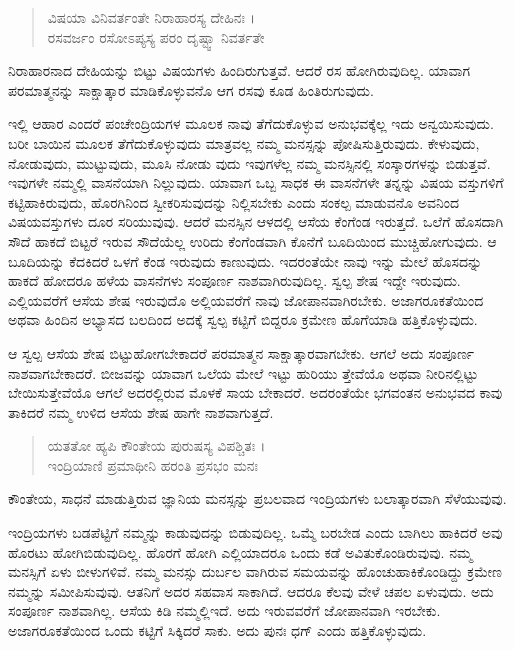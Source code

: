 \begin{verse}
ವಿಷಯಾ ವಿನಿವರ್ತಂತೇ ನಿರಾಹಾರಸ್ಯ ದೇಹಿನಃ ।\\ರಸವರ್ಜಂ ರಸೋಽಪ್ಯಸ್ಯ ಪರಂ ದೃಷ್ಟ್ವಾ ನಿವರ್ತತೇ 
\end{verse}

{\small ನಿರಾಹಾರನಾದ ದೇಹಿಯನ್ನು ಬಿಟ್ಟು ವಿಷಯಗಳು ಹಿಂದಿರುಗುತ್ತವೆ. ಆದರೆ ರಸ ಹೋಗಿರುವುದಿಲ್ಲ. ಯಾವಾಗ ಪರಮಾತ್ಮನನ್ನು ಸಾಕ್ಷಾತ್ಕಾರ ಮಾಡಿಕೊಳ್ಳುವನೊ ಆಗ ರಸವು ಕೂಡ ಹಿಂತಿರುಗುವುದು.}

ಇಲ್ಲಿ ಆಹಾರ ಎಂದರೆ ಪಂಚೇಂದ್ರಿಯಗಳ ಮೂಲಕ ನಾವು ತೆಗೆದುಕೊಳ್ಳುವ ಅನುಭವಕ್ಕೆಲ್ಲ ಇದು ಅನ್ವಯಿಸುವುದು. ಬರೀ ಬಾಯಿನ ಮೂಲಕ ತೆಗೆದುಕೊಳ್ಳುವುದು ಮಾತ್ರವಲ್ಲ ನಮ್ಮ ಮನಸ್ಸನ್ನು ಪೋಷಿಸುತ್ತಿರುವುದು. ಕೇಳುವುದು, ನೋಡುವುದು, ಮುಟ್ಟುವುದು, ಮೂಸಿ ನೋಡು ವುದು ಇವುಗಳೆಲ್ಲ ನಮ್ಮ ಮನಸ್ಸಿನಲ್ಲಿ ಸಂಸ್ಕಾರಗಳನ್ನು ಬಿಡುತ್ತವೆ. ಇವುಗಳೇ ನಮ್ಮಲ್ಲಿ ವಾಸನೆಯಾಗಿ ನಿಲ್ಲುವುದು. ಯಾವಾಗ ಒಬ್ಬ ಸಾಧಕ ಈ ವಾಸನೆಗಳೇ ತನ್ನನ್ನು ವಿಷಯ ವಸ್ತುಗಳಿಗೆ ಕಟ್ಟಿಹಾಕಿರುವುದು, ಹೊರಗಿನಿಂದ ಸ್ವೀಕರಿಸುವುದನ್ನು ನಿಲ್ಲಿಸಬೇಕು ಎಂದು ಸಂಕಲ್ಪ ಮಾಡುವನೊ ಅವನಿಂದ ವಿಷಯವಸ್ತುಗಳು ದೂರ ಸರಿಯುವುವು. ಆದರೆ ಮನಸ್ಸಿನ ಆಳದಲ್ಲಿ ಆಸೆಯ ಕೆಂಗೆಂಡ ಇರುತ್ತದೆ. ಒಲೆಗೆ ಹೊಸದಾಗಿ ಸೌದೆ ಹಾಕದೆ ಬಿಟ್ಟರೆ ಇರುವ ಸೌದೆಯೆಲ್ಲ ಉರಿದು ಕೆಂಗೆಂಡವಾಗಿ ಕೊನೆಗೆ ಬೂದಿಯಿಂದ ಮುಚ್ಚಿಹೋಗುವುದು. ಆ ಬೂದಿಯನ್ನು ಕೆದಕಿದರೆ ಒಳಗೆ ಕೆಂಡ ಇರುವುದು ಕಾಣುವುದು. ಇದರಂತೆಯೇ ನಾವು ಇನ್ನು ಮೇಲೆ ಹೊಸದನ್ನು ಹಾಕದೆ ಹೋದರೂ ಹಳೆಯ ವಾಸನೆಗಳು ಸಂಪೂರ್ಣ ನಾಶವಾಗಿರುವುದಿಲ್ಲ. ಸ್ವಲ್ಪ ಶೇಷ ಇದ್ದೇ ಇರುವುದು. ಎಲ್ಲಿಯವರೆಗೆ ಆಸೆಯ ಶೇಷ ಇರುವುದೊ ಅಲ್ಲಿಯವರೆಗೆ ನಾವು ಜೋಪಾನವಾಗಿರಬೇಕು. ಅಜಾಗರೂಕತೆಯಿಂದ ಅಥವಾ ಹಿಂದಿನ ಅಭ್ಯಾಸದ ಬಲದಿಂದ ಅದಕ್ಕೆ ಸ್ವಲ್ಪ ಕಟ್ಟಿಗೆ ಬಿದ್ದರೂ ಕ್ರಮೇಣ ಹೊಗೆಯಾಡಿ ಹತ್ತಿಕೊಳ್ಳುವುದು.

ಆ ಸ್ವಲ್ಪ ಆಸೆಯ ಶೇಷ ಬಿಟ್ಟುಹೋಗಬೇಕಾದರೆ ಪರಮಾತ್ಮನ ಸಾಕ್ಷಾತ್ಕಾರವಾಗಬೇಕು. ಆಗಲೆ ಅದು ಸಂಪೂರ್ಣ ನಾಶವಾಗಬೇಕಾದರೆ. ಬೀಜವನ್ನು ಯಾವಾಗ ಒಲೆಯ ಮೇಲೆ ಇಟ್ಟು ಹುರಿಯು ತ್ತೇವೆಯೊ ಅಥವಾ ನೀರಿನಲ್ಲಿಟ್ಟು ಬೇಯಿಸುತ್ತೇವೆಯೊ ಆಗಲೆ ಅದರಲ್ಲಿರುವ ಮೊಳಕೆ ಸಾಯ ಬೇಕಾದರೆ. ಅದರಂತೆಯೇ ಭಗವಂತನ ಅನುಭವದ ಕಾವು ತಾಕಿದರೆ ನಮ್ಮ ಉಳಿದ ಆಸೆಯ ಶೇಷ ಹಾಗೇ ನಾಶವಾಗುತ್ತದೆ.

\begin{verse}
ಯತತೋ ಹ್ಯಪಿ ಕೌಂತೇಯ ಪುರುಷಸ್ಯ ವಿಪಶ್ಚಿತಃ ।\\ಇಂದ್ರಿಯಾಣಿ ಪ್ರಮಾಥೀನಿ ಹರಂತಿ ಪ್ರಸಭಂ ಮನಃ 
\end{verse}

{\small ಕೌಂತೇಯ, ಸಾಧನೆ ಮಾಡುತ್ತಿರುವ ಜ್ಞಾನಿಯ ಮನಸ್ಸನ್ನು ಪ್ರಬಲವಾದ ಇಂದ್ರಿಯಗಳು ಬಲಾತ್ಕಾರವಾಗಿ ಸೆಳೆಯುವುವು.}

ಇಂದ್ರಿಯಗಳು ಬಡಪೆಟ್ಟಿಗೆ ನಮ್ಮನ್ನು ಕಾಡುವುದನ್ನು ಬಿಡುವುದಿಲ್ಲ. ಒಮ್ಮೆ ಬರಬೇಡ ಎಂದು ಬಾಗಿಲು ಹಾಕಿದರೆ ಅವು ಹೊರಟು ಹೋಗಿಬಿಡುವುದಿಲ್ಲ. ಹೊರಗೆ ಹೋಗಿ ಎಲ್ಲಿಯಾದರೂ ಒಂದು ಕಡೆ ಅವಿತುಕೊಂಡಿರುವುವು. ನಮ್ಮ ಮನಸ್ಸಿಗೆ ಏಳು ಬೀಳುಗಳಿವೆ. ನಮ್ಮ ಮನಸ್ಸು ದುರ್ಬಲ ವಾಗಿರುವ ಸಮಯವನ್ನು ಹೊಂಚುಹಾಕಿಕೊಂಡಿದ್ದು ಕ್ರಮೇಣ ನಮ್ಮನ್ನು ಸಮೀಪಿಸುವುವು. ಆತನಿಗೆ ಅದರ ಸಹವಾಸ ಸಾಕಾಗಿದೆ. ಆದರೂ ಕೆಲವು ವೇಳೆ ಚಪಲ ಏಳುವುದು. ಅದು ಸಂಪೂರ್ಣ ನಾಶವಾಗಿಲ್ಲ. ಆಸೆಯ ಕಿಡಿ ನಮ್ಮಲ್ಲಿಇದೆ. ಅದು ಇರುವವರೆಗೆ ಜೋಪಾನವಾಗಿ ಇರಬೇಕು. ಅಜಾಗರೂಕತೆಯಿಂದ ಒಂದು ಕಟ್ಟಿಗೆ ಸಿಕ್ಕಿದರೆ ಸಾಕು. ಅದು ಪುನಃ ಧಗ್ ಎಂದು ಹತ್ತಿಕೊಳ್ಳುವುದು.

